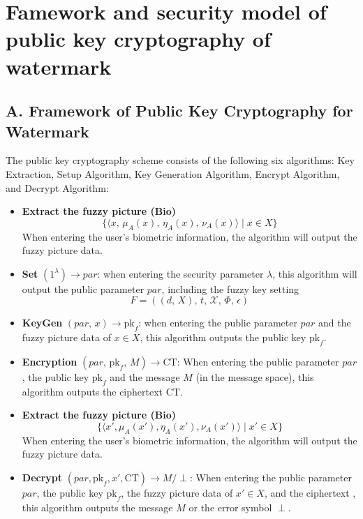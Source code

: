 \documentclass[graybox]{svmult}
\begin{document}
\section{Famework and security model of public key cryptography of watermark}
\subsection*{A. Framework of Public Key Cryptography for Watermark}

The public key cryptography scheme consists of the following six algorithms: Key Extraction, Setup Algorithm, Key Generation Algorithm, Encrypt Algorithm, and Decrypt Algorithm:

\begin{itemize}
    \item \textbf{Extract the fuzzy picture (Bio)}
          \[
              \{ \langle x,\, \mu_A(x),\, \eta_A(x),\, \nu_A(x) \rangle \mid x \in X \}
          \]
          When entering the user's biometric information, the algorithm will output the fuzzy picture data.

    \item \textbf{Set} \( (1^\lambda) \to par  \): when entering the security parameter \( \lambda \), this algorithm will output the public parameter \(  par \), including the fuzzy key setting
          \[
              F = ((d, \, X), \, t, \, \mathcal{X}, \, \varPhi, \, \epsilon)
          \]

    \item \textbf{KeyGen} \( (par ,\, x) \to \text{pk}_f \): when entering the public parameter \(  par \) and the fuzzy picture data of \( x \in X \), this algorithm outputs the public key \( \text{pk}_f \).

    \item \textbf{Encryption} \( (par ,\, \text{pk}_f,\, M) \to \text{CT} \): When entering the public parameter \(  par \), the public key \( \text{pk}_f \) and the message \( M \) (in the message space), this algorithm outputs the ciphertext \( \text{CT} \).

    \item \textbf{Extract the fuzzy picture (Bio)}
          \[
              \{ \langle x', \mu_A(x'), \eta_A(x'), \nu_A(x') \rangle \mid x' \in X \}
          \]
          When entering the user's biometric information, the algorithm will output the fuzzy picture data.

    \item \textbf{Decrypt} \( (par , \text{pk}_f, x', \text{CT}) \to M/\perp \): When entering the public parameter \(  par \), the public key \( \text{pk}_f \), the fuzzy picture data of \( x' \in X \), and the ciphertext , this algorithm outputs the message \( M \) or the error symbol \( \perp \).

\end{itemize}
\end{document}
